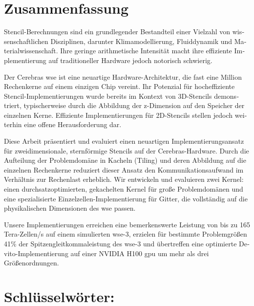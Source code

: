\begin{otherlanguage}{ngerman}
\section*{Zusammenfassung}
Stencil-Berechnungen sind ein grundlegender Bestandteil einer Vielzahl von wissenschaftlichen Disziplinen, darunter Klimamodellierung, Fluiddynamik und Materialwissenschaft. Ihre geringe arithmetische Intensität macht ihre effiziente Implementierung auf traditioneller Hardware jedoch notorisch schwierig.

Der Cerebras \acf{wse} ist eine neuartige Hardware-Architektur, die fast eine Million Rechenkerne auf einem einzigen Chip vereint. Ihr Potenzial für hocheffiziente Stencil-Implementierungen wurde bereits im Kontext von 3D-Stencils demonstriert, typischerweise durch die Abbildung der z-Dimension auf den Speicher der einzelnen Kerne. Effiziente Implementierungen für 2D-Stencils stellen jedoch weiterhin eine offene Herausforderung dar.

Diese Arbeit präsentiert und evaluiert einen neuartigen Implementierungsansatz für zweidimensionale, sternförmige Stencils auf der Cerebras-Hardware. Durch die Aufteilung der Problemdomäne in Kacheln (Tiling) und deren Abbildung auf die einzelnen Rechenkerne reduziert dieser Ansatz den Kommunikationsaufwand im Verhältnis zur Rechenlast erheblich. Wir entwickeln und evaluieren zwei Kernel: einen durchsatzoptimierten, gekachelten Kernel für große Problemdomänen und eine spezialisierte Einzelzellen-Implementierung für Gitter, die vollständig auf die physikalischen Dimensionen des \ac{wse} passen.

Unsere Implementierungen erreichen eine bemerkenswerte Leistung von bis zu 165 Tera-Zellen/s auf einem simulierten \ac{wse}-3, erzielen für bestimmte Problemgrößen 41\% der Spitzengleitkommaleistung des \ac{wse}-3 und übertreffen eine optimierte Devito-Implementierung auf einer NVIDIA H100 \ac{gpu} um mehr als drei Größenordnungen.

\section*{Schlüsselwörter:} \itshape \germankeywords
\end{otherlanguage}
